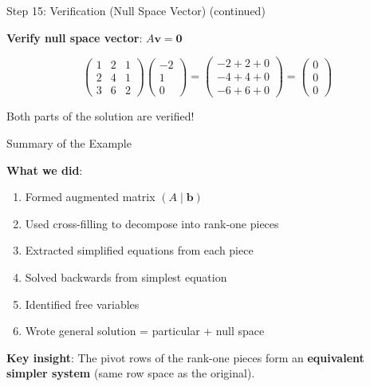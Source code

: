 \documentclass[10pt]{beamer}
\theoremstyle{definition}
\newcommand{\x}[1]{\alert{\textbf{#1}}}
\begin{document}
\begin{frame}{Step 15: Verification (Null Space Vector) (continued)}

\x{Verify null space vector}: $A\mathbf{v} = \mathbf{0}$

$$\begin{pmatrix} 1&2&1 \\ 2&4&1 \\ 3&6&2 \end{pmatrix} \begin{pmatrix} -2\\1\\0 \end{pmatrix} = \begin{pmatrix} -2+2+0 \\ -4+4+0 \\ -6+6+0 \end{pmatrix} = \begin{pmatrix} 0\\0\\0 \end{pmatrix}$$ \checkmark

\vspace{1em}

Both parts of the solution are verified!

\end{frame}

\begin{frame}{Summary of the Example}

\x{What we did}:
\begin{enumerate}
\item Formed augmented matrix $(A \mid \mathbf{b})$
\item Used cross-filling to decompose into rank-one pieces
\item Extracted simplified equations from each piece
\item Solved backwards from simplest equation
\item Identified free variables
\item Wrote general solution = particular + null space
\end{enumerate}

\vspace{1em}

\x{Key insight}: The pivot rows of the rank-one pieces form an \textbf{equivalent simpler system} (same row space as the original).

\end{frame}

\end{document}

